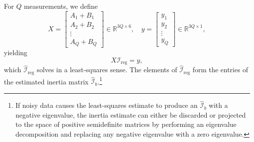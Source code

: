 \documentclass[letterpaper, 10 pt, journal, twoside]{IEEEtran}
\newcommand{\inertia}{{\mathcal{I}}}
\begin{document}
For $Q$ measurements, we define
\begin{equation}
    X = \begin{bmatrix}
        A_1 + B_1 \\
        A_2 + B_2 \\
        \vdots \\
        A_Q + B_Q
    \end{bmatrix} \in \mathbb{R}^{3Q \times 6}, \quad
    y = \begin{bmatrix}
        y_1 \\
        y_2 \\
        \vdots \\
        y_Q
    \end{bmatrix} \in \mathbb{R}^{3Q \times 1},
\end{equation}
yielding 
\begin{equation}
    X \inertia_{\operatorname{reg}} = y,
\end{equation}
which $\hat{\inertia}_{\operatorname{reg}}$ solves in a least-squares sense. The elements of $\hat{\inertia}_{\operatorname{reg}}$ form the entries of the estimated inertia matrix  $\hat{\inertia}_b$.\footnote{If noisy data causes the least-squares estimate to produce an $\hat{\inertia}_b$ with a negative eigenvalue, the inertia estimate can either be discarded or projected to the space of positive semidefinite matrices by performing an eigenvalue decomposition and replacing any negative eigenvalue with a zero eigenvalue.} 
\begin{comment}
Following the implementation of least-square minimization, $\inertia_{\operatorname{reg}}$ is rearranged back into $\inertia_b$. To ensure the $\inertia_b$ remains a positive-definite matrix after the matrix reconstruction, a post-adjustment could be made by modifying the eigenvalues of $\inertia_b$. First, we take an eigenvalue decomposition as:
\begin{equation}
    \inertia_b = Q \Lambda Q^{-1}
\end{equation}
where $Q$ is the square matrix whose $i$th column is the eigenvector $q_i$ of $\inertia_b$, and $\Lambda$ is the diagonal matrix whose diagonal elements are the eigenvalues $\Lambda_{ii} = \lambda_i$. When a negative value occurs in $\Lambda_{ii}$, we replace it with a small positive value, such as $\Lambda_{ii}' = 10^{-8}$, the matrix can be reconstructed as:
\begin{equation}
    \inertia_b' = Q \Lambda' Q^{-1}
\end{equation}
Here, we can ensure $\inertia_b'$ is a positive-definitive matrix.
\end{comment}
\end{document}
